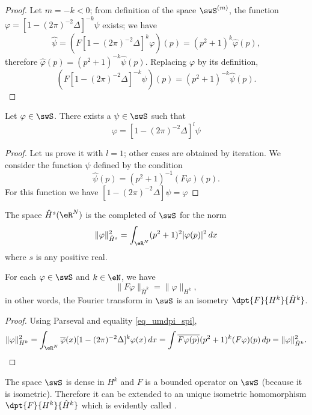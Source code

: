 \begin{proof}
Let $m=-k<0$; from definition of the space $\swS^{(m)}$, the function $\varphi=[1-(2\pi)^{-2}\Delta]^{-k}\psi$ exists; we have
\begin{equation}
\hat\psi=\left( F[1-(2\pi)^{-2}\Delta]^k\varphi \right)(p)
	=(p^2+1)^k\hat\varphi(p),
\end{equation}
therefore $\hat\varphi(p)=(p^2+1)^{-k}\hat\psi(p)$. Replacing $\varphi$ by its definition,
\begin{equation}
\left( F[1-(2\pi)^{-2}\Delta]^{-k}\psi \right)(p)=(p^2+1)^{-k}\hat\psi(p).
\end{equation}


\end{proof}

\begin{proposition}
Let $\varphi\in\swS$. There exists a $\psi\in\swS$ such that 
\[ 
  \varphi=[1-(2\pi)^{-2}\Delta]^l\psi
\]

\end{proposition}

\begin{proof}
Let us prove it with $l=1$; other cases are obtained by iteration. We consider the function $\psi$ defined by the condition
\[ 
  \hat\psi(p)=(p^2+1)^{-1}(F\varphi)(p).
\]
For this function we have $[1-(2\pi)^{-2}\Delta]\psi=\varphi$
\end{proof}

The space $\hat H^s(\eR^N)$ is the completed of $\swS$ for the norm
\begin{equation}
\| \varphi \|^2_{\hat H^s}=\int_{\eR^N}(p^2+1)^2| \varphi(p) |^2\,dx
\end{equation}
where $s$ is any positive real.


\begin{theorem}
For each $\varphi\in\swS$ and $k\in\eN$, we have
\[ 
  \| F\varphi \|_{\hat H^k}=\| \varphi \|_{H^k},
\]
in other words, the Fourier transform in $\swS$ is an isometry $\dpt{F}{ H^k }{ \hat H^k }$.

\end{theorem}


\begin{proof}
Using Parseval and equality \eqref{eq_umdpi_spi},
\begin{equation}
\| \varphi \|_{H^k}^2=\int_{\eR^N}\overline{ \varphi }(x)[1-(2\pi)^{-2}\Delta]^k\varphi(x)\,dx
		=\int \overline{ F\varphi(p) }(p^2+1)^k(F\varphi)(p)\,dp\\
		=\| \varphi \|_{\hat H^k}^2.
\end{equation}
\end{proof}
The space $\swS$ is dense in $H^k$ and $F$ is a bounded operator on $\swS$ (because it is isometric). Therefore it can be extended to an unique isometric homomorphism $\dpt{ F }{ H^k }{ \hat H^k }$ which is evidently called .


